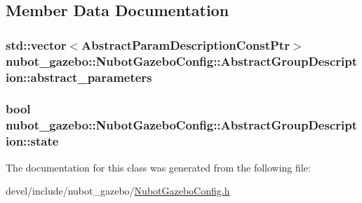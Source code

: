 \subsection{Member Data Documentation}
\hypertarget{classnubot__gazebo_1_1NubotGazeboConfig_1_1AbstractGroupDescription_a7b4dc2fe6c727cf2342b8260ab417d8f}{
\subsubsection[{abstract\-\_\-parameters}]{\setlength{\rightskip}{0pt plus 5cm}std\-::vector$<${\bf Abstract\-Param\-Description\-Const\-Ptr}$>$ nubot\-\_\-gazebo\-::\-Nubot\-Gazebo\-Config\-::\-Abstract\-Group\-Description\-::abstract\-\_\-parameters}}\label{classnubot__gazebo_1_1NubotGazeboConfig_1_1AbstractGroupDescription_a7b4dc2fe6c727cf2342b8260ab417d8f}
\hypertarget{classnubot__gazebo_1_1NubotGazeboConfig_1_1AbstractGroupDescription_a1bd0e496a3763e1d887d4604d636d3d4}{
\subsubsection[{state}]{\setlength{\rightskip}{0pt plus 5cm}bool nubot\-\_\-gazebo\-::\-Nubot\-Gazebo\-Config\-::\-Abstract\-Group\-Description\-::state}}\label{classnubot__gazebo_1_1NubotGazeboConfig_1_1AbstractGroupDescription_a1bd0e496a3763e1d887d4604d636d3d4}


The documentation for this class was generated from the following file\-:\begin{DoxyCompactItemize}
\item 
devel/include/nubot\-\_\-gazebo/\hyperlink{NubotGazeboConfig_8h}{Nubot\-Gazebo\-Config.\-h}\end{DoxyCompactItemize}
